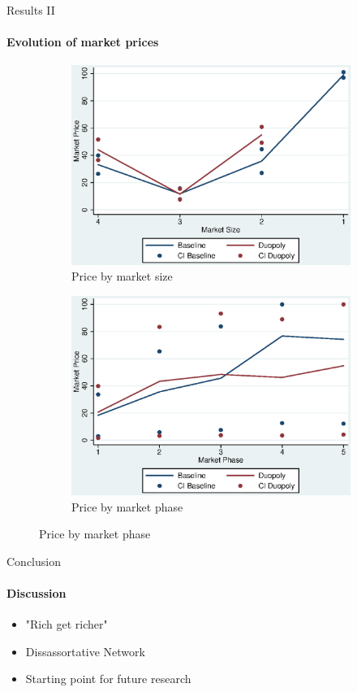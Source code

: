 \documentclass{beamer}
\begin{document}
\begin{frame} {Results II}
	\framesubtitle{Evolution of market prices}			
	
	\begin{figure}
		\centering
		\caption{Evolution of average market prices by treatment}
		\begin{subfigure}{.4\textwidth}
			\centering
			\includegraphics[width=0.9\linewidth]{market_price_on_market_size.eps}
			\caption{Price by market size}
		\end{subfigure}
		\begin{subfigure}{.4\textwidth}
			\centering
			\includegraphics[width=0.9\linewidth]{market_price_over_period_mean.eps}
			\caption{Price by market phase}
		\end{subfigure}
	\end{figure}
	
\end{frame} 


\begin{frame}{Conclusion}
\framesubtitle{Discussion}			

	\begin{itemize}
		\item "Rich get richer"
		\item Dissassortative Network
		\item Starting point for future research
	\end{itemize}
\end{frame}

	
\end{document}
